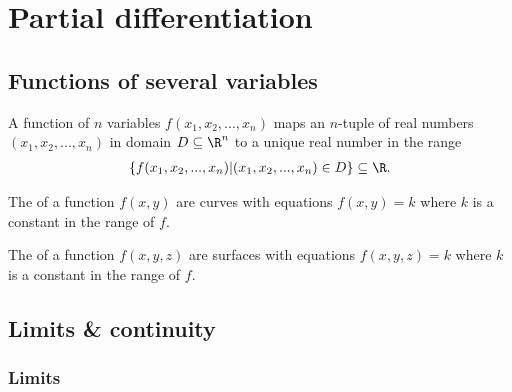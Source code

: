 \documentclass{article}
\begin{document}
\section{Partial differentiation}



\subsection{Functions of several variables}


\begin{definition}
    A function of $n$ variables $f(x_1, x_2, ..., x_n)$ maps an $n$-tuple
    of real numbers $(x_1, x_2, ..., x_n)$ in domain $D\subseteq\R^n$ to
    a unique real number in the range
    \begin{align*}
        \{f(x_1, x_2, ..., x_n)|(x_1, x_2, ..., x_n)\in D\} \subseteq \R.
    \end{align*}
\end{definition}
\begin{definition}
    The  of a function $f(x,y)$ are curves with equations
    $f(x,y)=k$ where $k$ is a constant in the range of $f$.
\end{definition}
\begin{definition}
    The  of a function $f(x,y,z)$ are surfaces with
    equations $f(x,y,z)=k$ where $k$ is a constant in the range of $f$.
\end{definition}


\subsection{Limits \& continuity}


\subsubsection{Limits}
\end{document}
